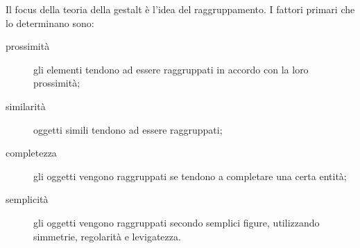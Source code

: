 Il focus della teoria della gestalt è l’idea del raggruppamento. I fattori primari che lo determinano sono:
\begin{description}
  \item[prossimità] gli elementi tendono ad essere raggruppati in accordo con la loro prossimità;
  \item[similarità] oggetti simili tendono ad essere raggruppati;
  \item[completezza] gli oggetti vengono raggruppati se tendono a completare una certa entità;
  \item[semplicità] gli oggetti vengono raggruppati secondo semplici figure, utilizzando simmetrie, regolarità e levigatezza.
\end{description}